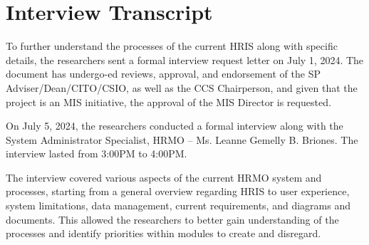\chapter{Interview Transcript}

\label{AppendixB}

To further understand the processes of the current HRIS along with specific details, the researchers sent a formal interview request letter on July 1, 2024. The document has undergo-ed reviews, approval, and endorsement of the SP Adviser/Dean/CITO/CSIO, as well as the CCS Chairperson, and given that the project is an MIS initiative, the approval of the MIS Director is requested.

On July 5, 2024, the researchers conducted a formal interview along with the System Administrator Specialist, HRMO -- Ms. Leanne Gemelly B. Briones. The interview lasted from 3:00PM to 4:00PM.

The interview covered various aspects of the current HRMO system and processes, starting from a general overview regarding HRIS to user experience, system limitations, data management, current requirements, and diagrams and documents. This allowed the researchers to better gain understanding of the processes and identify priorities within modules to create and disregard.

